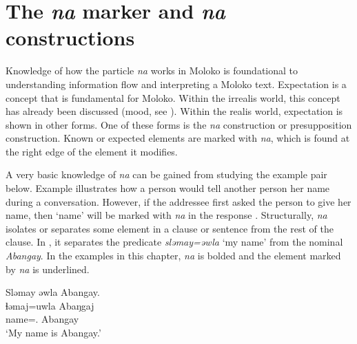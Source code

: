 \chapter[The na marker and na constructions]{The \textit{na} marker and \textit{na} constructions}\label{chap:11}
\hypertarget{RefHeading1213141525720847}{}
Knowledge of how the particle \textit{na} works in Moloko is foundational to understanding information flow and interpreting a Moloko text. Expectation is a concept that is fundamental for Moloko. Within the irrealis world, this concept has already been discussed (mood, see ). Within the realis world, expectation is shown in other forms. One of these forms is the \textit{na} construction or presupposition construction. Known or expected elements are marked with \textit{na}, which is found at the right edge of the element it modifies.

A very basic knowledge of \textit{na} can be gained from studying the example pair below. Example  illustrates how a person would tell another person her name during a conversation. However, if the addressee first asked the person to give her name, then ‘name’ will be marked with \textit{na} in the response . Structurally, \textit{na}  isolates or separates some element in a clause or sentence from the rest of the clause. In , it separates the predicate \textit{sl}\textit{əmay=əwla} ‘my name’ from the nominal \textit{Abangay}. In the examples in this chapter, \textit{na} is bolded and the element marked by \textit{na}  is underlined.

\ea \label{ex:11:1}
Sləmay  əwla  Abangay.\\
\gll  ɬəmaj=uwla     Abaŋgaj\\
      name={\oneS}.{\POSS}  Abangay\\
\glt  ‘My name is Abangay.’
\z

